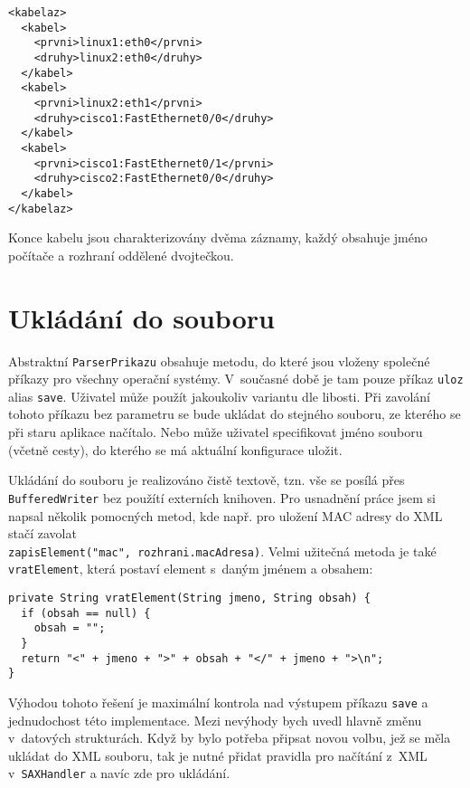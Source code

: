 \begin{verbatim}
<kabelaz>
  <kabel>
    <prvni>linux1:eth0</prvni>
    <druhy>linux2:eth0</druhy>
  </kabel>
  <kabel>
    <prvni>linux2:eth1</prvni>
    <druhy>cisco1:FastEthernet0/0</druhy>
  </kabel>
  <kabel>
    <prvni>cisco1:FastEthernet0/1</prvni>
    <druhy>cisco2:FastEthernet0/0</druhy>
  </kabel>
</kabelaz>
\end{verbatim} 

Konce kabelu jsou charakterizovány dvěma záznamy, každý obsahuje jméno počítače a rozhraní oddělené dvojtečkou.


\section{Ukládání do souboru}
Abstraktní \verb|ParserPrikazu| obsahuje metodu, do které jsou vloženy společné příkazy pro všechny operační systémy. V~současné době je tam pouze příkaz \verb|uloz| alias \verb|save|. Uživatel může použít jakoukoliv variantu dle libosti. Při zavolání tohoto příkazu bez parametru se bude ukládat do stejného souboru, ze kterého se při staru aplikace načítalo. Nebo může uživatel specifikovat jméno souboru (včetně cesty), do kterého se má aktuální konfigurace uložit. 

Ukládání do souboru je realizováno čistě textově, tzn. vše se posílá přes \verb|BufferedWriter| bez použítí externích knihoven. Pro usnadnění práce jsem si napsal několik pomocných metod, kde např. pro uložení MAC adresy do XML stačí zavolat \\\verb|zapisElement("mac", rozhrani.macAdresa)|. Velmi užitečná metoda je také \verb|vratElement|, která postaví element s~daným jménem a obsahem:
\begin{verbatim}
private String vratElement(String jmeno, String obsah) {
  if (obsah == null) {
    obsah = "";
  }
  return "<" + jmeno + ">" + obsah + "</" + jmeno + ">\n";
}
\end{verbatim} 


Výhodou tohoto řešení je maximální kontrola nad výstupem příkazu \verb|save| a jednudochost této implementace. Mezi nevýhody bych uvedl hlavně změnu v~datových strukturách. Když by bylo potřeba připsat novou volbu, jež se měla ukládat do XML souboru, tak je nutné přidat pravidla pro načítání z~XML v~\verb|SAXHandler| a navíc zde pro ukládání.






